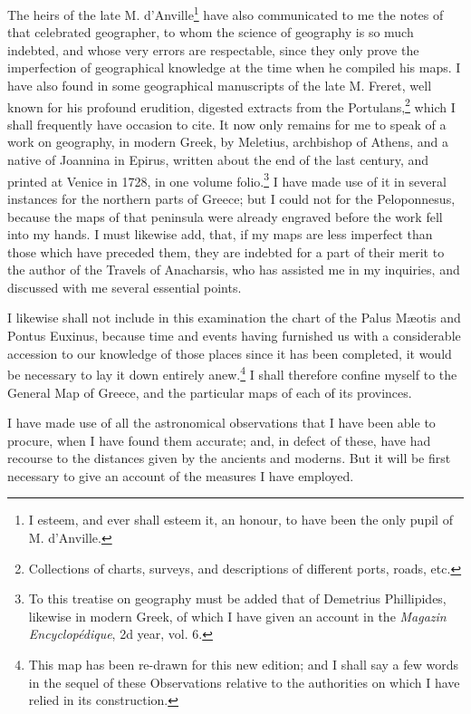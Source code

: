 \documentclass[a4paper, 11pt, oneside, polutonikogreek, english]{article}
\begin{document}
The heirs of the late M. d'Anville\footnote{I esteem, and ever shall esteem it, an honour, to have been the only pupil of M. d'Anville.} have also communicated to me the notes of that celebrated geographer, to whom the science of geography is so much indebted, and whose very errors are respectable, since they only prove the imperfection of geographical knowledge at the time when he compiled his maps. I have also found in some geographical manuscripts of the late M. Freret, well known for his profound erudition, digested extracts from the Portulans,\footnote{Collections of charts, surveys, and descriptions of different ports, roads, etc.} which I shall frequently have occasion to cite. It now only remains for me to speak of a work on geography, in modern Greek, by Meletius, archbishop of Athens, and a native of Joannina in Epirus, written about the end of the last century, and printed at Venice in 1728, in one volume folio.\footnote{To this treatise on geography must be added that of Demetrius Phillipides, likewise in modern Greek, of which I have given an account in the \emph{Magazin Encyclopédique}, 2d year, vol. 6.} I have made use of it in several instances for the northern parts of Greece; but I could not for the Peloponnesus, because the maps of that peninsula were already engraved before the work fell into my hands. I must likewise add, that, if my maps are less imperfect than those which have preceded them, they are indebted for a part of their merit to the author of the Travels of Anacharsis, who has assisted me in my inquiries, and discussed with me several essential points.

I likewise shall not include in this examination the chart of the Palus Mæotis and Pontus Euxinus, because time and events having furnished us with a considerable accession to our knowledge of those places since it has been completed, it would be necessary to lay it down entirely anew.\footnote{This map has been re-drawn for this new edition; and I shall say a few words in the sequel of these Observations relative to the authorities on which I have relied in its construction.} I shall therefore confine myself to the General Map of Greece, and the particular maps of each of its provinces.

I have made use of all the astronomical observations that I have been able to procure, when I have found them accurate; and, in defect of these, have had recourse to the distances given by the ancients and moderns. But it will be first necessary to give an account of the measures I have employed.
\end{document}
